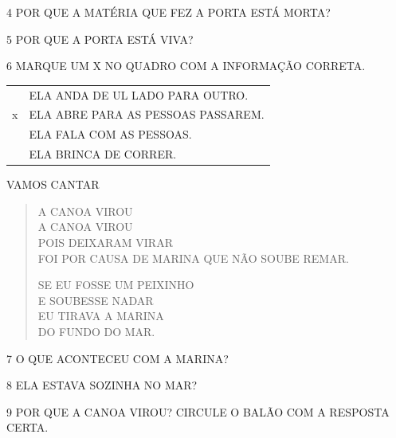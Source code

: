 \begin{escola}

\num{4} POR QUE A MATÉRIA QUE FEZ A PORTA ESTÁ MORTA?


\num{5} POR QUE A PORTA ESTÁ VIVA?


\num{6} MARQUE UM X NO QUADRO COM A INFORMAÇÃO CORRETA.

\begin{longtable}[]{@{}ll@{}}
\toprule
& ELA ANDA DE UL LADO PARA OUTRO.\tabularnewline
x & ELA ABRE PARA AS PESSOAS PASSAREM.\tabularnewline
& ELA FALA COM AS PESSOAS.\tabularnewline
& ELA BRINCA DE CORRER.\tabularnewline
\bottomrule
\end{longtable}

VAMOS CANTAR

\begin{verse}
A CANOA VIROU\\
A CANOA VIROU\\
POIS DEIXARAM VIRAR\\
FOI POR CAUSA DE MARINA QUE NÃO SOUBE REMAR.

SE EU FOSSE UM PEIXINHO\\
E SOUBESSE NADAR\\
EU TIRAVA A MARINA\\
DO FUNDO DO MAR.
\end{verse}


\num{7} O QUE ACONTECEU COM A MARINA?


\num{8} ELA ESTAVA SOZINHA NO MAR?


\num{9} POR QUE A CANOA VIROU? CIRCULE O BALÃO COM A RESPOSTA CERTA.

\begin{multicols}




\end{multicols}


\end{escola}
